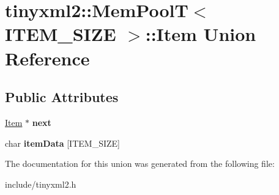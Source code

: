 \hypertarget{uniontinyxml2_1_1MemPoolT_1_1Item}{}\section{tinyxml2\+::Mem\+PoolT$<$ I\+T\+E\+M\+\_\+\+S\+I\+ZE $>$\+::Item Union Reference}
\label{uniontinyxml2_1_1MemPoolT_1_1Item}
\subsection*{Public Attributes}
\begin{DoxyCompactItemize}
\item 
\mbox{\label{uniontinyxml2_1_1MemPoolT_1_1Item_a5620107f518c60d6619e8662d4c9d643}} 
\mbox{\hyperlink{uniontinyxml2_1_1MemPoolT_1_1Item}{Item}} $\ast$ {\bfseries next}
\item 
\mbox{\label{uniontinyxml2_1_1MemPoolT_1_1Item_aff63ccc8d7b05035820b83e1f0fa8037}} 
char {\bfseries item\+Data} \mbox{[}I\+T\+E\+M\+\_\+\+S\+I\+ZE\mbox{]}
\end{DoxyCompactItemize}


The documentation for this union was generated from the following file\+:\begin{DoxyCompactItemize}
\item 
include/tinyxml2.\+h\end{DoxyCompactItemize}
